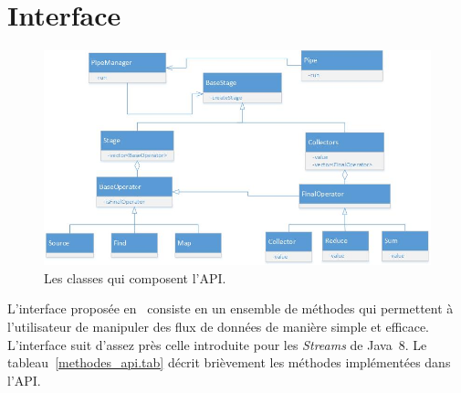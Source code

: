 \section{Interface}

\begin{figure}[ht]
\centering
     \includegraphics[width=1.0\textwidth]{Figures/ClassDiagramme.jpg}
      \caption{Les classes qui composent l'{API}.}
       \label{ClassDiagramme.fig}
\end{figure}


L'interface propos\'ee en \PpFf\ consiste en un ensemble de m\'ethodes qui permettent \`a l'utilisateur de manipuler des flux de donn\'ees de mani\`ere simple et efficace. L'interface suit d'assez pr\`es celle introduite pour les \emph{Streams} de Java~8. Le tableau~\ref{methodes_api.tab} d\'ecrit bri\`evement les m\'ethodes impl\'ement\'ees dans l'API.





%
%
%



